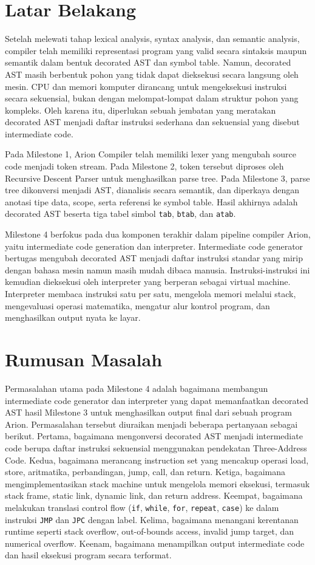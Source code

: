 \section{Latar Belakang}
Setelah melewati tahap lexical analysis, syntax analysis, dan semantic analysis, compiler telah memiliki representasi program yang valid secara sintaksis maupun semantik dalam bentuk decorated AST dan symbol table. Namun, decorated AST masih berbentuk pohon yang tidak dapat dieksekusi secara langsung oleh mesin. CPU dan memori komputer dirancang untuk mengeksekusi instruksi secara sekuensial, bukan dengan melompat-lompat dalam struktur pohon yang kompleks. Oleh karena itu, diperlukan sebuah jembatan yang meratakan decorated AST menjadi daftar instruksi sederhana dan sekuensial yang disebut intermediate code.

Pada Milestone 1, Arion Compiler telah memiliki lexer yang mengubah source code menjadi token stream. Pada Milestone 2, token tersebut diproses oleh Recursive Descent Parser untuk menghasilkan parse tree. Pada Milestone 3, parse tree dikonversi menjadi AST, dianalisis secara semantik, dan diperkaya dengan anotasi tipe data, scope, serta referensi ke symbol table. Hasil akhirnya adalah decorated AST beserta tiga tabel simbol \texttt{tab}, \texttt{btab}, dan \texttt{atab}.

Milestone 4 berfokus pada dua komponen terakhir dalam pipeline compiler Arion, yaitu intermediate code generation dan interpreter. Intermediate code generator bertugas mengubah decorated AST menjadi daftar instruksi standar yang mirip dengan bahasa mesin namun masih mudah dibaca manusia. Instruksi-instruksi ini kemudian dieksekusi oleh interpreter yang berperan sebagai virtual machine. Interpreter membaca instruksi satu per satu, mengelola memori melalui stack, mengevaluasi operasi matematika, mengatur alur kontrol program, dan menghasilkan output nyata ke layar.

\section{Rumusan Masalah}
Permasalahan utama pada Milestone 4 adalah bagaimana membangun intermediate code generator dan interpreter yang dapat memanfaatkan decorated AST hasil Milestone 3 untuk menghasilkan output final dari sebuah program Arion. Permasalahan tersebut diuraikan menjadi beberapa pertanyaan sebagai berikut. Pertama, bagaimana mengonversi decorated AST menjadi intermediate code berupa daftar instruksi sekuensial menggunakan pendekatan Three-Address Code. Kedua, bagaimana merancang instruction set yang mencakup operasi load, store, aritmatika, perbandingan, jump, call, dan return. Ketiga, bagaimana mengimplementasikan stack machine untuk mengelola memori eksekusi, termasuk stack frame, static link, dynamic link, dan return address. Keempat, bagaimana melakukan translasi control flow (\texttt{if}, \texttt{while}, \texttt{for}, \texttt{repeat}, \texttt{case}) ke dalam instruksi \texttt{JMP} dan \texttt{JPC} dengan label. Kelima, bagaimana menangani kerentanan runtime seperti stack overflow, out-of-bounds access, invalid jump target, dan numerical overflow. Keenam, bagaimana menampilkan output intermediate code dan hasil eksekusi program secara terformat.

